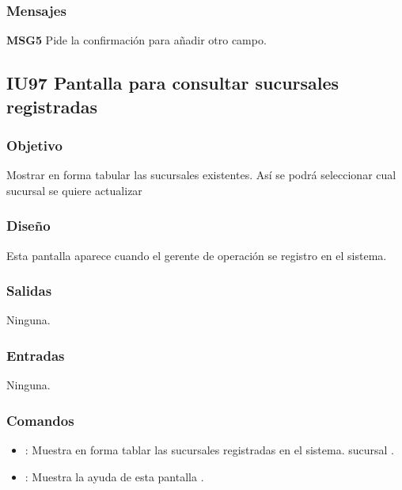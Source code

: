 \subsubsection{Mensajes}
	\begin{Citemize}
		\item {\bf MSG5} Pide la confirmación para añadir otro campo.
	\end{Citemize}


\subsection{IU97 Pantalla para consultar sucursales registradas}

\subsubsection{Objetivo}
	Mostrar en forma tabular las sucursales existentes. Así se podrá seleccionar cual sucursal se quiere actualizar

\subsubsection{Diseño}
	Esta pantalla aparece cuando el gerente de operación se registro en el sistema.


\subsubsection{Salidas}

	Ninguna.

\subsubsection{Entradas}
	Ninguna.

\subsubsection{Comandos}
\begin{itemize}
	\item {}: Muestra en forma tablar las sucursales registradas en el sistema. sucursal .
	\item {}: Muestra la ayuda de esta pantalla .
\end{itemize}

